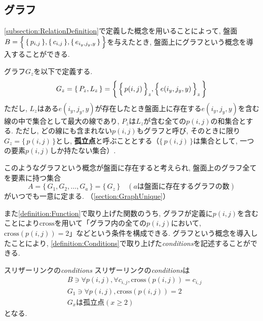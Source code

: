 \subsection{グラフ}\label{subsection:GraphDefinition}
\cref{subsection:RelationDefinition}で定義した概念を用いることによって, 盤面$B=\Bigl\{\,\{\,p_{i,j}\,\},\{\,c_{i,j}\,\},\{\,e_{i_y,j_y,y}\,\}\,\Bigr\}$を与えたとき, 盤面上にグラフという概念を導入することができる.

\begin{definition}[グラフ]\label{definition:GraphDefinition}
  グラフ$G_z$を以下で定義する.
  \begin{equation}
    G_z=\{\,P_z,L_z\,\}=\biggl\{\, \Bigl\{\,p(i,j)\,\Bigr\}_z,\Bigl\{\,e(i_y,j_y,y)\,\Bigr\}_z\,\biggr\}
  \end{equation}
  ただし, $L_z$はある$e(i_y,j_y,y)$が存在したとき盤面上に存在する$e(i_y,j_y,y)$を含む線の中で集合として最大の線であり, $P_z$は$L_z$が含む全ての$p(i,j)$の和集合とする. ただし, どの線にも含まれない$p(i,j)$もグラフと呼び, そのときに限り$G_z=\{\,p(i,j)\,\}$とし, \textbf{孤立点}と呼ぶこととする（$\{\,p(i,j)\,\}$は集合として, 一つの要素$p(i,j)$しか持たない集合）.
\end{definition}

このようなグラフという概念が盤面に存在すると考えられ, 盤面上のグラフ全てを要素に持つ集合
\begin{equation}
  A=\{\,G_1,G_2,\ldots,G_a\,\}=\{\,G_z\,\}\quad (aは盤面に存在するグラフの数)\label{equation:A}
\end{equation}
がいつでも一意に定まる. （\cref{section:GraphUnique}）

また\cref{definition:Function}で取り上げた関数のうち, グラフが定義に$p(i,j)$を含むことにより$\text{cross}$を用いて「グラフ内の全ての$p(i,j)$において, $\text{cross}(p(i,j))=2$」などという条件を構成できる. グラフという概念を導入したことにより, \cref{definition:Conditions}で取り上げた\textit{conditions}を記述することができる.
\begin{example}\textup{スリザーリンクの\textit{conditions}}\label{example:SlitherLinkConditions}
  スリザーリンクの\textit{conditions}は
  \begin{align}
     & B\ni \forall p(i,j)   , \forall c_{i,j} , \text{cross}(p(i,j))=c_{i,j}\label{equation:SlitherLinkConditions_1} \\
     & G_1\ni \forall p(i,j)            , \text{cross}(p(i,j))=2             \label{equation:SlitherLinkConditions_2} \\
     & G_xは孤立点(x\ge 2)                                                     \label{equation:SlitherLinkConditions_3}
  \end{align}
  となる.
\end{example}

